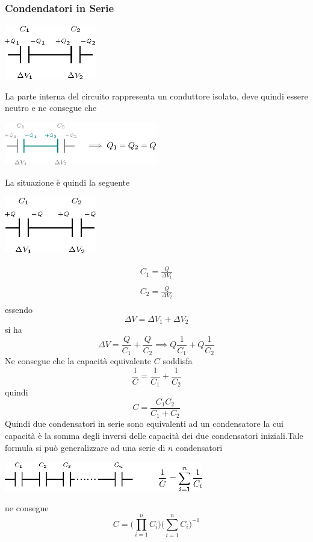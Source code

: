 \documentclass[10pt, letterpaper]{report}
\begin{document}
\subsubsection{Condendatori in Serie}
\begin{center}
    \includegraphics[width=0.3\textwidth]{images/condensatoreSerie1.eps}
\end{center} 
La parte interna del circuito rappresenta un conduttore isolato, deve quindi essere neutro e ne consegue che 
\begin{center}
    \includegraphics[width=0.5\textwidth]{images/condensatoreSerie2.eps}
\end{center} 
La situazione è quindi la seguente 
\begin{center}
    \includegraphics[width=0.3\textwidth]{images/condensatoreSerie3.eps}
\end{center} 
$$ \begin{matrix}
    C_1 = \frac{Q}{\Delta V_1}\\ \\
    C_2 = \frac{Q}{\Delta V_2} \\ 
\end{matrix}$$essendo
$$ 
\Delta V = \Delta V_1+\Delta V_2
$$ si ha 
$$ 
 \Delta V=\frac{Q}{C_1}+\frac{Q}{C_2}\implies Q\frac{1}{C_1}+Q\frac{1}{C_2}$$
 Ne consegue che la capacità equivalente $C$ soddisfa 
 $$ \frac{1}{C}=\frac{1}{C_1}+\frac{1}{C_2}$$
 quindi 
 $$ C=\frac{C_1C_2}{C_1+C_2}$$
Quindi due condensatori in serie sono equivalenti ad un condensatore la cui capacità è la somma degli inversi delle capacità dei due condensatori iniziali.\acc  Tale formula si può generalizzare ad una serie di $n$ condensatori\begin{center}
    \includegraphics[width=0.65\textwidth]{images/condensatoreSerie4.eps}
\end{center} 
ne consegue 
$$ C=\Big(\displaystyle  \prod_{i=1}^n C_i\Big)\Big(\displaystyle \sum_{i=1}^n C_i\Big)^{-1}$$
\end{document}
